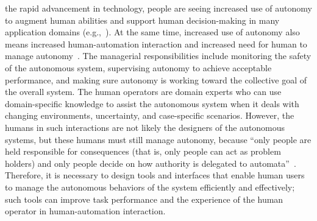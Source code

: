 \documentclass[journal]{IEEEtran}
\begin{document}
 the rapid advancement in technology, people are seeing increased use of autonomy to augment human abilities and support human decision-making in many application domains (e.g.,~\cite{Chun2010Limousine,Casper2003Human,Lin2010Supporting,Robins2009From}). At the same time, increased use of autonomy also means increased human-automation interaction and increased need for human to manage autonomy~\cite{Bainbridge1983Ironies}. The managerial responsibilities include monitoring the safety of the autonomous system, supervising autonomy to achieve acceptable performance, and making sure autonomy is working toward the collective goal of the overall system. The human operators are domain experts who can use domain-specific knowledge to assist the autonomous system when it deals with changing environments, uncertainty, and case-specific scenarios. However, the humans in such interactions are not likely the designers of the autonomous systems, but these humans must still manage autonomy, because ``only people are held responsible for consequences (that is, only people can act as problem holders) and only people decide on how authority is delegated to automata''~\cite{Woods2006Joint,Bradshaw2013Seven}. Therefore, it is necessary to design tools and interfaces that enable human users to manage the autonomous behaviors of the system efficiently and effectively; such tools can improve task performance and the experience of the human operator in human-automation interaction.
\end{document}
